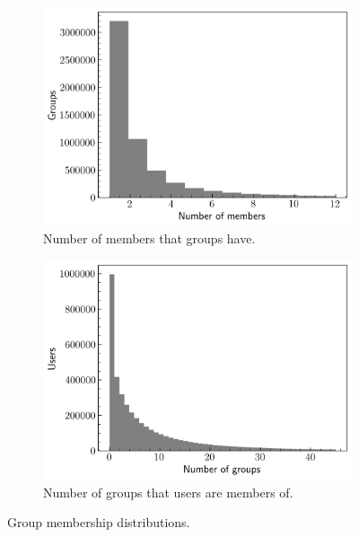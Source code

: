 \begin{figure}[ht]
    \centering
    \begin{subfigure}[ht]{0.49\textwidth}
        \centering
        \includegraphics[width=\textwidth]{figures/03_dataset/02_hist_group_users.png}
        \caption{Number of members that groups have.}
        \label{fig:Dataset_HistGroupUsers}
    \end{subfigure}
    \hfill
    \begin{subfigure}[ht]{0.49\textwidth}
        \centering
        \includegraphics[width=\textwidth]{figures/03_dataset/03_hist_user_groups.png}
        \caption{Number of groups that users are members of.}
        \label{fig:Dataset_HistUserGroups}
    \end{subfigure}
    \caption{Group membership distributions.}
    \label{fig:Dataset_HistsGroups}
\end{figure}

